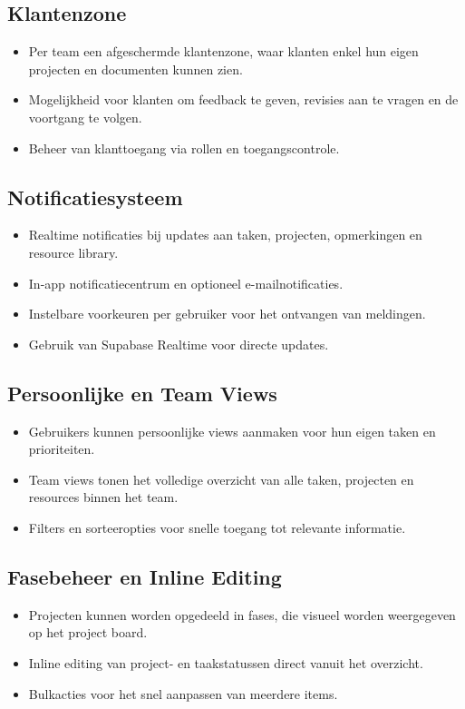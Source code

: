 \subsection{Klantenzone}
\begin{itemize}
    \item Per team een afgeschermde klantenzone, waar klanten enkel hun eigen projecten en documenten kunnen zien.
    \item Mogelijkheid voor klanten om feedback te geven, revisies aan te vragen en de voortgang te volgen.
    \item Beheer van klanttoegang via rollen en toegangscontrole.
\end{itemize}

\subsection{Notificatiesysteem}
\begin{itemize}
    \item Realtime notificaties bij updates aan taken, projecten, opmerkingen en resource library.
    \item In-app notificatiecentrum en optioneel e-mailnotificaties.
    \item Instelbare voorkeuren per gebruiker voor het ontvangen van meldingen.
    \item Gebruik van Supabase Realtime voor directe updates.
\end{itemize}

\subsection{Persoonlijke en Team Views}
\begin{itemize}
    \item Gebruikers kunnen persoonlijke views aanmaken voor hun eigen taken en prioriteiten.
    \item Team views tonen het volledige overzicht van alle taken, projecten en resources binnen het team.
    \item Filters en sorteeropties voor snelle toegang tot relevante informatie.
\end{itemize}

\subsection{Fasebeheer en Inline Editing}
\begin{itemize}
    \item Projecten kunnen worden opgedeeld in fases, die visueel worden weergegeven op het project board.
    \item Inline editing van project- en taakstatussen direct vanuit het overzicht.
    \item Bulkacties voor het snel aanpassen van meerdere items.
\end{itemize}

